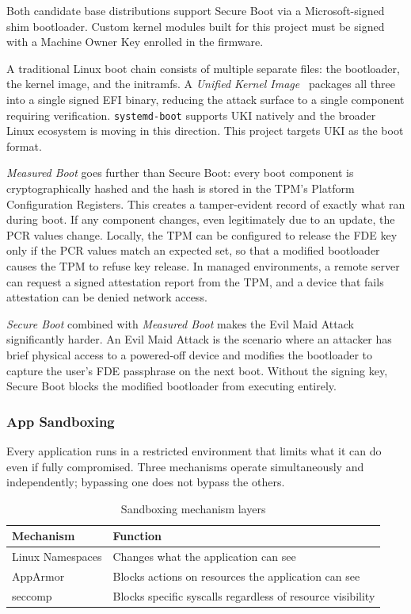 Both candidate base distributions support Secure Boot via a Microsoft-signed
shim bootloader. Custom kernel modules built for this project must be signed
with a Machine Owner Key enrolled in the firmware.

A traditional Linux boot chain consists of multiple separate files: the
bootloader, the kernel image, and the initramfs. A \emph{Unified Kernel Image}~\cite{archwiki:uki}
packages all three into a single signed EFI binary, reducing the attack
surface to a single component requiring verification. \texttt{systemd-boot}
supports UKI natively and the broader Linux ecosystem is moving in this
direction. This project targets UKI as the boot format.

\emph{Measured Boot} goes further than Secure Boot: every boot component is
cryptographically hashed and the hash is stored in the TPM's Platform
Configuration Registers. This creates a tamper-evident record of exactly what
ran during boot. If any component changes, even legitimately due to an update,
the PCR values change. Locally, the TPM can be configured to release the FDE
key only if the PCR values match an expected set, so that a modified bootloader
causes the TPM to refuse key release. In managed environments, a remote server
can request a signed attestation report from the TPM, and a device that fails
attestation can be denied network access.

\emph{Secure Boot} combined with \emph{Measured Boot} makes the Evil Maid
Attack significantly harder. An Evil Maid Attack is the scenario where an
attacker has brief physical access to a powered-off device and modifies the
bootloader to capture the user's FDE passphrase on the next boot. Without
the signing key, Secure Boot blocks the modified bootloader from executing
entirely.

\subsubsection{App Sandboxing}
\label{sec:sandboxing}

Every application runs in a restricted environment that limits what it can do
even if fully compromised. Three mechanisms operate simultaneously and
independently; bypassing one does not bypass the others.

\begin{table}[htbp]
\caption{Sandboxing mechanism layers}
\label{tab:sandboxing}
\begin{tabularx}{\linewidth}{lX}
\toprule
\textbf{Mechanism} & \textbf{Function} \\
\midrule
Linux Namespaces & Changes what the application can see \\
AppArmor         & Blocks actions on resources the application can see \\
seccomp          & Blocks specific syscalls regardless of resource visibility \\
\bottomrule
\end{tabularx}
\end{table}

